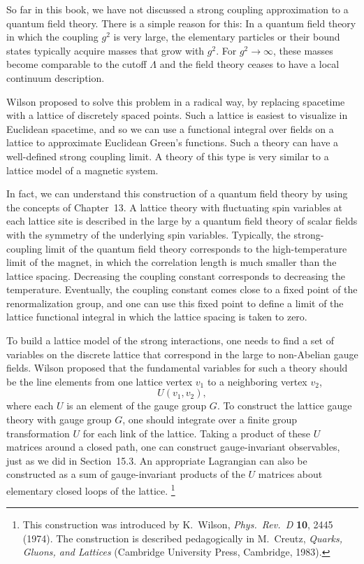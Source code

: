 So far in this book, we have not discussed a strong coupling approximation to
a quantum field theory.  There is a simple reason for this: In a quantum
field theory in which the coupling $g^2$ is very large, the elementary
particles or their bound states typically acquire masses that grow with
$g^2$.  For $g^2\to\infty$, these masses become comparable to the cutoff
$\Lambda$ and the field theory ceases to have a local continuum
description.

Wilson proposed to solve this problem in a radical way, by replacing
spacetime with a lattice of discretely spaced points.  Such a lattice is
easiest to visualize in Euclidean spacetime, and so we can use a functional
integral over fields on a lattice to approximate Euclidean Green's functions.
Such a theory can have a well-defined strong coupling limit.  A theory of
this type is very similar to a lattice model of a magnetic system.

In fact, we can understand this construction of a quantum field theory by
using the concepts of Chapter~13.  A lattice theory with fluctuating spin
variables at each lattice site is described in the large by a quantum field
theory of scalar fields with the symmetry of the underlying spin variables.
Typically, the strong-coupling limit of the quantum field theory corresponds
to the high-temperature limit of the magnet, in which the correlation length
is much smaller than the lattice spacing.  Decreasing the coupling constant
corresponds to decreasing the temperature.  Eventually, the coupling constant
comes close to a fixed point of the renormalization group, and one can use
this fixed point to define a limit of the lattice functional integral in
which the lattice spacing is taken to zero.

To build a lattice model of the strong interactions, one needs to find a set
of variables on the discrete lattice that correspond in the large to
non-Abelian gauge fields.  Wilson proposed that the fundamental variables for
such a theory should be the line elements from one lattice vertex $v_1$ to a
neighboring vertex $v_2$,
\begin{equation}
  U(v_1, v_2) ,
  \label{eq:22.1}
\end{equation}
where each $U$ is an element of the gauge group $G$.  To construct the
lattice gauge theory with gauge group $G$, one should integrate over a finite
group transformation $U$ for each link of the lattice.  Taking a product of
these $U$ matrices around a closed path, one can construct gauge-invariant
observables, just as we did in Section~15.3.  An appropriate Lagrangian can
also be constructed as a sum of gauge-invariant products of the $U$ matrices
about elementary closed loops of the lattice.%
\footnote{This construction was introduced by K.~Wilson, \emph{Phys.\ Rev.\ D}
\textbf{10}, 2445 (1974).  The construction is described pedagogically in
M.~Creutz, \emph{Quarks, Gluons, and Lattices} (Cambridge University Press,
Cambridge, 1983).}

